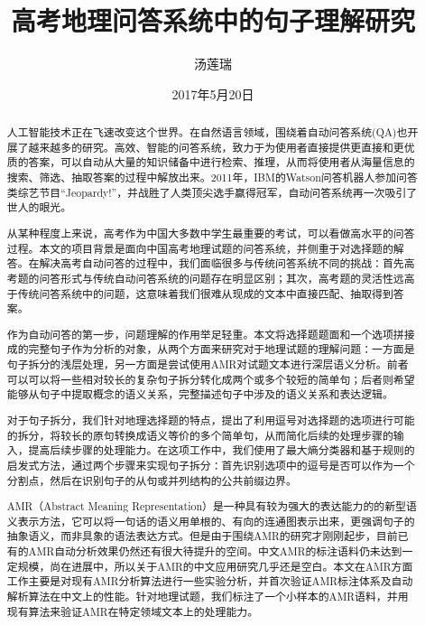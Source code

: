 \documentclass[master, winfont]{njuthesis}
\title{高考地理问答系统中的句子理解研究}
\author{汤莲瑞}
\institute{南京大学}
\date{2017年5月20日}
\begin{document}

\maketitle
\makeenglishtitle


\frontmatter

\begin{abstract}
人工智能技术正在飞速改变这个世界。在自然语言领域，围绕着自动问答系统(QA)也开展了越来越多的研究。高效、智能的问答系统，致力于为使用者直接提供更直接和更优质的答案，可以自动从大量的知识储备中进行检索、推理，从而将使用者从海量信息的搜索、筛选、抽取答案的过程中解放出来。2011年，IBM的Watson问答机器人参加问答类综艺节目“Jeopardy!”，并战胜了人类顶尖选手赢得冠军，自动问答系统再一次吸引了世人的眼光。

从某种程度上来说，高考作为中国大多数中学生最重要的考试，可以看做高水平的问答过程。本文的项目背景是面向中国高考地理试题的问答系统，并侧重于对选择题的解答。在解决高考自动问答的过程中，我们面临很多与传统问答系统不同的挑战：首先高考题的问答形式与传统自动问答系统的问题存在明显区别；其次，高考题的灵活性远高于传统问答系统中的问题，这意味着我们很难从现成的文本中直接匹配、抽取得到答案。

作为自动问答的第一步，问题理解的作用举足轻重。本文将选择题题面和一个选项拼接成的完整句子作为分析的对象，从两个方面来研究对于地理试题的理解问题：一方面是句子拆分的浅层处理，另一方面是尝试使用AMR对试题文本进行深层语义分析。前者可以可以将一些相对较长的复杂句子拆分转化成两个或多个较短的简单句；后者则希望能够从句子中提取概念的语义关系，完整描述句子中涉及的语义关系和表达逻辑。

对于句子拆分，我们针对地理选择题的特点，提出了利用逗号对选择题的选项进行可能的拆分，将较长的原句转换成语义等价的多个简单句，从而简化后续的处理步骤的输入，提高后续步骤的处理能力。在这项工作中，我们使用了最大熵分类器和基于规则的启发式方法，通过两个步骤来实现句子拆分：首先识别选项中的逗号是否可以作为一个分割点，然后在识别句子的从句或并列结构的公共前缀边界。

AMR（Abstract Meaning Representation）是一种具有较为强大的表达能力的的新型语义表示方法，它可以将一句话的语义用单根的、有向的连通图表示出来，更强调句子的抽象语义，而非具象的语法表达方式。但是由于围绕AMR的研究才刚刚起步，目前已有的AMR自动分析效果仍然还有很大待提升的空间。中文AMR的标注语料仍未达到一定规模，尚在进展中，所以关于AMR的中文应用研究几乎还是空白。本文在AMR方面工作主要是对现有AMR分析算法进行一些实验分析，并首次验证AMR标注体系及自动解析算法在中文上的性能。针对地理试题，我们标注了一个小样本的AMR语料，并用现有算法来验证AMR在特定领域文本上的处理能力。


\end{abstract}
\end{document}
